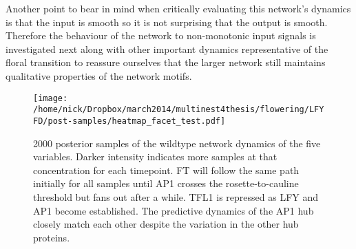 Another point to bear in mind when critically evaluating this network's dynamics is that the input is smooth so it is not surprising that the output is smooth.
Therefore the behaviour of the network to non-monotonic input signals is investigated next along with other important dynamics representative of the floral transition to reassure ourselves that the larger network still maintains qualitative properties of the network motifs.

\begin{figure*}[!htbp]
\centering
\texttt{[image: /home/nick/Dropbox/march2014/multinest4thesis/flowering/LFYFD/post-samples/heatmap\_facet\_test.pdf]}
\caption{2000 posterior samples of the wildtype network dynamics of the five variables.
Darker intensity indicates more samples at that concentration for each timepoint.
FT will follow the same path initially for all samples until AP1 crosses the rosette-to-cauline threshold but fans out after a while.
TFL1 is repressed as LFY and AP1 become established.
The predictive dynamics of the AP1 hub closely match each other despite the variation in the other hub proteins.
}
\label{fig:wtDynFacet}
\end{figure*}
